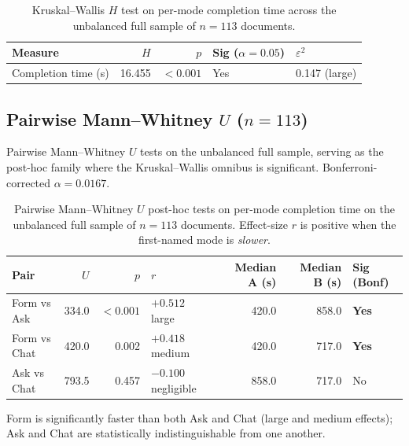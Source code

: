\begin{table}[htbp]
\centering
\caption{Kruskal--Wallis $H$ test on per-mode completion time
across the unbalanced full sample of $n = 113$ documents.}
\label{tab:app-timing-kw}
\small
\begin{tabular}{@{}l r r l l@{}}
\toprule
Measure & $H$ & $p$ & Sig ($\alpha = 0.05$) & $\varepsilon^2$ \\
\midrule
Completion time (s) & 16.455 & $<0.001$ & Yes & 0.147 (large) \\
\bottomrule
\end{tabular}
\end{table}

\subsection{Pairwise Mann--Whitney $U$ ($n = 113$)}

Pairwise Mann--Whitney $U$ tests on the unbalanced full sample,
serving as the post-hoc family where the Kruskal--Wallis omnibus
is significant. Bonferroni-corrected $\alpha = 0.0167$.

\begin{table}[htbp]
\centering
\caption{Pairwise Mann--Whitney $U$ post-hoc tests on per-mode
completion time on the unbalanced full sample of $n = 113$
documents. Effect-size $r$ is positive when the first-named mode
is \emph{slower}.}
\label{tab:app-timing-mwu}
\small
\setlength{\tabcolsep}{4pt}
\begin{tabular}{@{}l r r l r r l@{}}
\toprule
Pair & $U$ & $p$ & $r$ & Median A (s) & Median B (s) & Sig (Bonf) \\
\midrule
Form vs Ask  & 334.0 & $<0.001$ & $+0.512$ large       & 420.0 & 858.0 & \textbf{Yes} \\
Form vs Chat & 420.0 & 0.002    & $+0.418$ medium      & 420.0 & 717.0 & \textbf{Yes} \\
Ask vs Chat  & 793.5 & 0.457    & $-0.100$ negligible  & 858.0 & 717.0 & No \\
\bottomrule
\end{tabular}
\end{table}

Form is significantly faster than both Ask and Chat (large and
medium effects); Ask and Chat are statistically indistinguishable
from one another.
